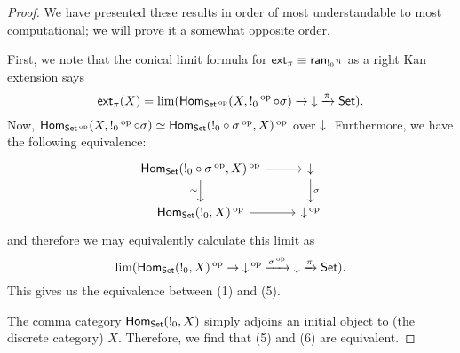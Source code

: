\begin{proof}
We have presented these results in order of most understandable to most
computational; we will prove it a somewhat opposite order.

First, we note that the conical limit formula for $\ext_{\pi} \equiv
\term{ran}_{!_0} \pi$ as a right Kan extension says
$$\ext_\pi(X)= \lim(\Hom_{\Set\op}(X, !_0\op \circ \sigma) \to \down \xto{\pi} \Set).$$
Now,
$\Hom_{\Set\op}(X, !_0\op \circ \sigma) \simeq \Hom_{\Set}(!_0 \circ \sigma\op,
X)\op$ over $\down$. Furthermore, we have the following equivalence:
\[
\begin{tikzcd}
{\Hom_{\Set}(!_0 \circ \sigma\op, X)\op} \arrow[d, "\sim"'] \arrow[r] & \down \arrow[d, "\sigma"] \\
{\Hom_{\Set}(!_0, X)\op} \arrow[r]                                    & \down\op                 
\end{tikzcd}
\]
and therefore we may equivalently calculate this limit as 
$$\lim(\Hom_{\Set}(!_0, X)\op \to \down\op \xto{\sigma\op} \down \xto{\pi} \Set).$$
This gives us the equivalence between (1) and (5).

The comma category $\Hom_{\Set}(!_0, X)$ simply adjoins an initial object
to (the discrete category) $X$. Therefore, we find that (5) and (6) are equivalent.


\end{proof}
